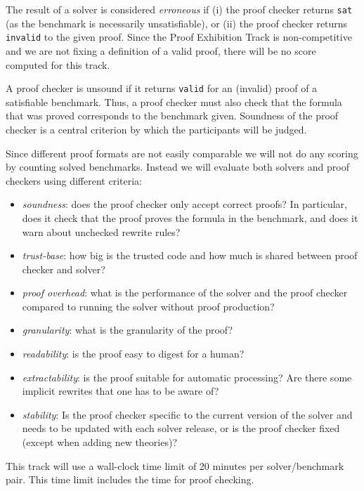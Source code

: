 \documentclass[12pt]{article}
\newcommand{\prooftrack}{Proof Exhibition Track\xspace}
\begin{document}
%
The result of a solver is considered \emph{erroneous} if (i) the
proof checker returns \texttt{sat} (as the
benchmark is necessarily unsatisfiable), or
%
(ii) the proof checker returns \texttt{invalid} to
the given proof.
%
Since the \prooftrack is non-competitive and we are not fixing a definition of a
valid proof, there will be no score computed for this track.

A proof checker is unsound if it returns \texttt{valid} for an (invalid) proof
of a satisfiable benchmark.
%
Thus, a proof checker must also check that the formula that was proved
corresponds to the benchmark given.  Soundness of the proof checker is a central
criterion by which the participants will be judged.

%
Since different proof formats are not easily comparable we will not do
any scoring by counting solved benchmarks.  Instead we will evaluate
both solvers and proof checkers using different criteria:
\begin{itemize}
\item \emph{soundness}: does the proof checker only accept correct
  proofs?  In particular, does it check that the proof proves the formula
  in the benchmark, and does it warn about unchecked rewrite rules?
\item \emph{trust-base}: how big is the trusted code and how much is
  shared between proof checker and solver?
\item \emph{proof overhead}: what is the performance of the solver and
  the proof checker compared to running the solver without proof
  production?
\item \emph{granularity}: what is the granularity of the proof?
\item \emph{readability}: is the proof easy to digest for a human?
\item \emph{extractability}: is the proof suitable for automatic
  processing?  Are there some implicit rewrites that one has to be
  aware of?
\item \emph{stability}: Is the proof checker specific to the current
  version of the solver and needs to be updated with each solver
  release, or is the proof checker fixed (except when adding new
  theories)?
\end{itemize}

This track will use a wall-clock time limit of 20 minutes per solver/benchmark
pair. This time limit includes the time for proof checking.
\end{document}
